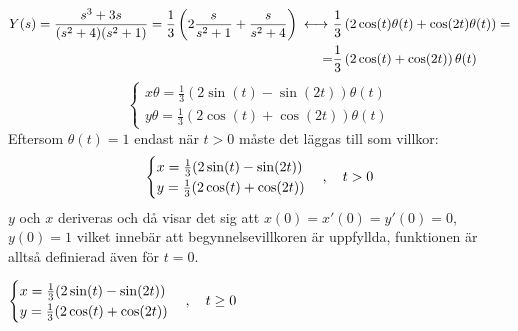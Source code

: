 \begin{task}{5.14}
\begin{align*}
	\end{align*}
	\begin{align*}
	Y(s)=
	\frac{s^3+3s}{(s^2+4)(s^2+1)}=
	\frac{1}{3}\left(2\frac{s}{s^2+1}+\frac{s}{s^2+4}\right)\llra
	&\frac{1}{3}\left(2\cos(t)\theta(t)+\cos(2t)\theta(t)\right)= \\ =
	&\frac{1}{3}\left(2\cos(t)+\cos(2t)\right)\theta(t)
	\end{align*}
	\[\begin{cases}
	x\theta=\frac{1}{3}(2\sin(t)-\sin(2t))\theta(t) \\
	y\theta=\frac{1}{3}(2\cos(t)+\cos(2t))\theta(t)
	\end{cases}\]
	Eftersom $\theta(t)=1$ endast när $t>0$ måste det läggas till som villkor:
	\[\begin{cases}
	x=\frac{1}{3}(2\sin(t)-\sin(2t)) \\
	y=\frac{1}{3}(2\cos(t)+\cos(2t))
	\end{cases}, \quad t > 0\]
	$y$ och $x$ deriveras och då visar det sig att $x(0)=x'(0)=y'(0)=0$, $y(0)=1$ vilket innebär att begynnelsevillkoren är uppfyllda, funktionen är alltså definierad även för $t=0$.
	
	\ans 
	$\begin{cases}
	x=\frac{1}{3}(2\sin(t)-\sin(2t)) \\
	y=\frac{1}{3}(2\cos(t)+\cos(2t))
	\end{cases}, \quad t \ge 0$
\end{task}

